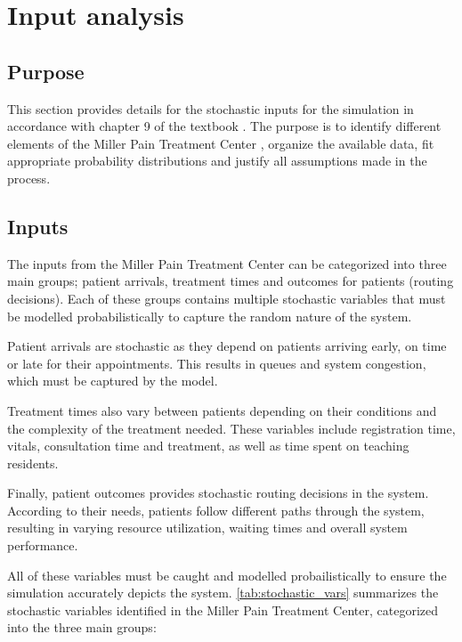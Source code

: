 \newpage
\section{Input analysis}

\subsection{Purpose}
This section provides details for the stochastic inputs for the simulation in accordance with chapter 9 of the textbook \parencite{pensumbok}. The purpose is to identify different elements of the Miller Pain Treatment Center \parencite{MillerPainTreatmentCenter}, organize the available data, fit appropriate probability distributions and justify all assumptions made in the process.

\subsection{Inputs}
The inputs from the Miller Pain Treatment Center can be categorized into three main groups; patient arrivals, treatment times and outcomes for patients (routing decisions). Each of these groups contains multiple stochastic variables that must be modelled probabilistically to capture the random nature of the system.

Patient arrivals are stochastic as they depend on patients arriving early, on time or late for their appointments. This results in queues and system congestion, which must be captured by the model.

Treatment times also vary between patients depending on their conditions and the complexity of the treatment needed. These variables include registration time, vitals, consultation time and treatment, as well as time spent on teaching residents.

Finally, patient outcomes provides stochastic routing decisions in the system. According to their needs, patients follow different paths through the system, resulting in varying resource utilization, waiting times and overall system performance. 

All of these variables must be caught and modelled probailistically to ensure the simulation accurately depicts the system. \autoref{tab:stochastic_vars} summarizes the stochastic variables identified in the Miller Pain Treatment Center, categorized into the three main groups:

